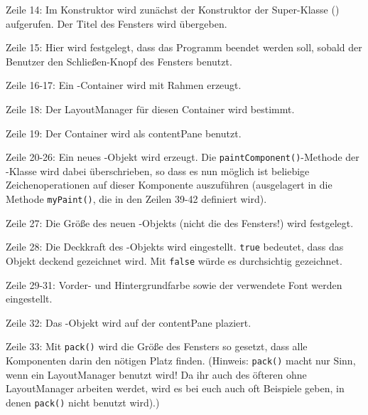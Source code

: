 \begin{compactitem}
\item[Zeile 14:] Im Konstruktor wird zunächst der Konstruktor der Super-Klasse
() aufgerufen. Der Titel des Fensters wird übergeben.

\item[Zeile 15:] Hier wird festgelegt, dass das Programm beendet werden soll,
sobald der Benutzer den Schließen-Knopf des Fensters benutzt.

\item[Zeile 16-17:] Ein -Container wird mit Rahmen erzeugt.

\item[Zeile 18:] Der LayoutManager für diesen Container wird bestimmt.

\item[Zeile 19:] Der Container wird als contentPane benutzt.

\item[Zeile 20-26:]  Ein neues -Objekt wird erzeugt. Die
\lstinline|paintComponent()|-Methode der -Klasse wird dabei
überschrieben, so dass es nun möglich ist beliebige Zeichenoperationen auf
dieser Komponente auszuführen (ausgelagert in die Methode \lstinline|myPaint()|,
die in den Zeilen 39-42 definiert wird).

\item[Zeile 27:] Die Größe des neuen -Objekts (nicht die des
Fensters!) wird festgelegt.

\item[Zeile 28:] Die Deckkraft des -Objekts wird eingestellt.
\lstinline|true| bedeutet, dass das Objekt deckend gezeichnet wird. Mit
\lstinline|false| würde es durchsichtig gezeichnet.

\item[Zeile 29-31:] Vorder- und Hintergrundfarbe sowie der verwendete Font
werden eingestellt.

\item[Zeile 32:] Das -Objekt wird auf der contentPane plaziert.

\item[Zeile 33:] Mit \lstinline|pack()| wird die Größe des Fensters so gesetzt,
dass alle Komponenten darin den nötigen Platz finden. (Hinweis:
\lstinline|pack()| macht nur Sinn, wenn ein LayoutManager benutzt wird! Da ihr
auch des öfteren ohne LayoutManager arbeiten werdet, wird es bei euch auch oft
Beispiele geben, in denen \lstinline|pack()| nicht benutzt wird).) 


\end{compactitem}
